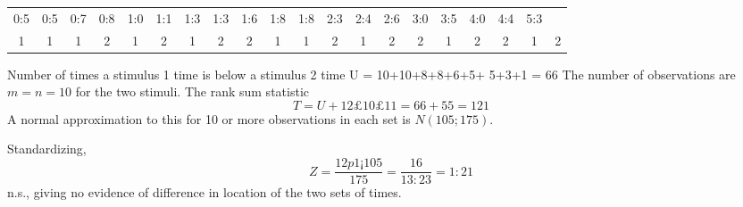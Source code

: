 \documentclass[a4paper,12pt]{article}
\begin{document}
\begin{enumerate}
\begin{tabular}{ccccccccccccccccccc}
0:5 & 0:5&  0:7 & 0:8 & 1:0&  1:1&  1:3&  1:3 & 1:6&  1:8&  1:8&  2:3&  2:4&  2:6&  3:0&  3:5&  4:0&  4:4&  5:3\\
1 & 1 & 1 & 2 & 1 & 2 & 1 & 2&  2 & 1&  1 & 2&  1 & 2&  2&  1&  2&  2&  1&  2 \\
\end{tabular}


Number of times a stimulus 1 time is below a stimulus 2 time U = 10+10+8+8+6+5+
5+3+1 = 66 The number of observations are $m = n = 10$ for the two stimuli. The rank
sum statistic \[T = U+1
2£10£11 = 66+55 = 121\] A normal approximation to this for 10 or
more observations in each set is $N(105; 175)$. 

Standardizing, 
\[Z = \frac{12p1¡105}{175}
= \frac{16}{13:23} = 1:21\]
n.s., giving no evidence of difference in location of the two sets of times.

\end{enumerate}
\end{document}
